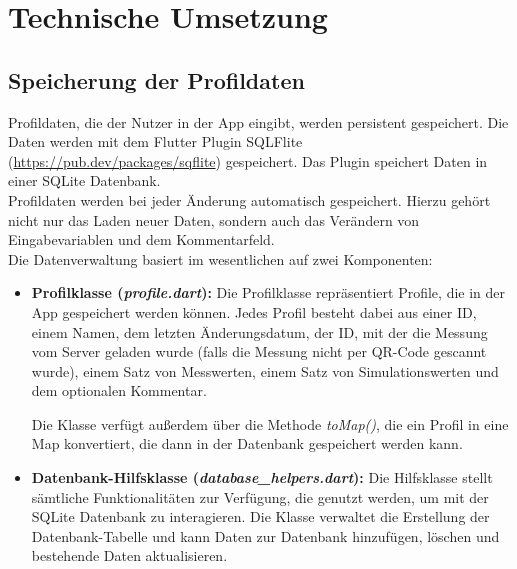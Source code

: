 \chapter{Technische Umsetzung}
\label{chap:technUmsetzung}

	\section{Speicherung der Profildaten}
	\label{sec:speicherungProfildaten}
	
	Profildaten, die der Nutzer in der App eingibt, werden persistent gespeichert. Die Daten werden mit dem Flutter Plugin SQLFlite (\url{https://pub.dev/packages/sqflite}) gespeichert. Das Plugin speichert Daten in einer SQLite Datenbank.
	\\
	Profildaten werden bei jeder Änderung automatisch gespeichert. Hierzu gehört nicht nur das Laden neuer Daten, sondern auch das Verändern von Eingabevariablen und dem Kommentarfeld.
	\\
	Die Datenverwaltung basiert im wesentlichen auf zwei Komponenten:
	
	\begin{itemize}
		\item \textbf{Profilklasse (\textit{profile.dart}):} Die Profilklasse repräsentiert Profile, die in der App gespeichert werden können. Jedes Profil besteht dabei aus einer ID, einem Namen, dem letzten Änderungsdatum, der ID, mit der die Messung vom Server geladen wurde (falls die Messung nicht per QR-Code gescannt wurde), einem Satz von Messwerten, einem Satz von Simulationswerten und dem optionalen Kommentar.
		
		Die Klasse verfügt außerdem über die Methode \textit{toMap()}, die ein Profil in eine Map konvertiert, die dann in der Datenbank gespeichert werden kann.				

		\item \textbf{Datenbank-Hilfsklasse (\textit{database\_helpers.dart}):} Die Hilfsklasse stellt sämtliche Funktionalitäten zur Verfügung, die genutzt werden, um mit der SQLite Datenbank zu interagieren. Die Klasse verwaltet die Erstellung der Datenbank-Tabelle und kann Daten zur Datenbank hinzufügen, löschen und bestehende Daten aktualisieren.
		
	\end{itemize}

